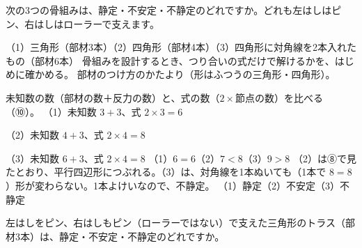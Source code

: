 \begin{phreidai}
\label{ph:力-5:ex14}次の3つの骨組みは、静定・不安定・不静定のどれですか。どれも左はしはピン、右はしはローラーで支えます。\par
（1）三角形（部材3本）\quad（2）四角形（部材4本）\quad（3）四角形に対角線を2本入れたもの（部材6本）
\phbamen
骨組みを設計するとき、つり合いの式だけで解けるかを、はじめに確かめる。
\phmushi
部材のつけ方のかたより（形はふつうの三角形・四角形）。
\phzu
\noindent\begin{minipage}[c]{\linewidth}
\centering
{}
\end{minipage}
\phriyu
未知数の数（部材の数＋反力の数）と、式の数（$2\times$節点の数）を比べる（⑩）。
\phtateru
（1）未知数 $3+3$、式 $2\times3=6$\par
（2）未知数 $4+3$、式 $2\times4=8$\par
（3）未知数 $6+3$、式 $2\times4=8$
\phtoku
（1）$6=6$\quad（2）$7<8$\quad（3）$9>8$
\phtashikame
（2）は⑧で見たとおり、平行四辺形につぶれる。（3）は、対角線を1本ぬいても（1本で $8=8$）形が変わらない。1本よけいなので、不静定。
\kotae （1）静定\quad（2）不安定\quad（3）不静定
\end{phreidai}
\begin{jibun}
左はしをピン、右はしもピン（ローラーではない）で支えた三角形のトラス（部材3本）は、静定・不安定・不静定のどれですか。
\end{jibun}

